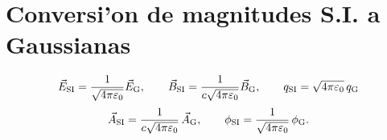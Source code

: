 \section{Conversi'on de magnitudes S.I. a Gaussianas}
\begin{equation}
\vec{E}_{\rm SI}=\frac{1}{\sqrt{4\pi\varepsilon_0}}\vec{E}_{\rm G}, \qquad 
\vec{B}_{\rm SI}= \frac{1}{c\sqrt{4\pi\varepsilon_0}}\vec{B}_{\rm G}, \qquad 
q_{\rm SI}=\sqrt{4\pi\varepsilon_0}\,q_{\rm G}
\end{equation}
\begin{equation}
\vec{A}_{\rm SI}=\frac{1}{c\sqrt{4\pi\varepsilon_0}}\,\vec{A}_{\rm G}, \qquad
\phi_{\rm SI}=\frac{1}{\sqrt{4\pi\varepsilon_0}}\,\phi_{\rm G}.
\end{equation}

